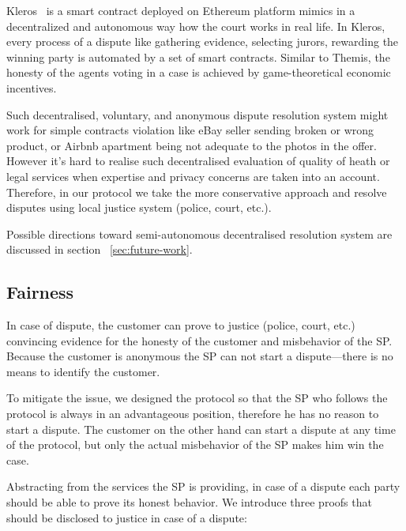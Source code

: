 \documentclass{ieeeaccess}
\begin{document}
Kleros~\cite{lesaege2018kleros} is a smart contract deployed on
Ethereum platform mimics in a decentralized and autonomous way how
the court works in real life. In Kleros, every process of a dispute like
gathering evidence, selecting jurors, rewarding the winning party is 
automated by a set of smart contracts. Similar to Themis, the honesty
of the agents voting in a case is achieved by game-theoretical economic
incentives.

Such decentralised, voluntary, and anonymous dispute resolution system
might work for simple contracts violation like eBay seller sending
broken or wrong product, or Airbnb apartment being not adequate to the
photos in the offer. However it's hard to realise such decentralised
evaluation of quality of heath or legal services when expertise and
privacy concerns are taken into an account. Therefore, in our protocol
we take the more conservative approach and resolve disputes using local
justice system (police, court, etc.).

Possible directions toward semi-autonomous decentralised resolution
system are discussed in section ~\ref{sec:future-work}.


\subsection{Fairness}\label{proof-of-justice}

In case of dispute, the customer can prove to justice (police, court, etc.) convincing evidence for the honesty of the customer and misbehavior of the SP. 
Because the customer is anonymous the SP can not start a dispute---there is no means to identify the customer.

To mitigate the issue, we designed the protocol so that the SP who follows the protocol is always in an advantageous position, therefore he has no reason to start a dispute. The customer on the other hand can start a dispute at any time of the protocol, but only the actual misbehavior of the SP makes him win the case.



Abstracting from the services the SP is providing, in case of a dispute each party should be able to prove its honest behavior. We introduce three proofs that should be disclosed to justice in case of a dispute:
\end{document}
